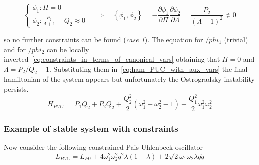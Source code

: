 \begin{equation*}
  \begin{cases}
    \phi_1: \Pi = 0 \\
    \phi_2: \frac{P_2}{\Lambda + 1} - Q_2 \approx 0
  \end{cases}
  \quad \Rightarrow \quad
  \left\{ \phi_1, \phi_2 \right\} = -
  \frac{\partial\phi_1}{\partial\Pi} \frac{\partial\phi_2}{\partial\Lambda} =
  \frac{P_2}{{(\Lambda + 1)}^2} \not\approx 0
\end{equation*}

so no further constraints can be found (\emph{case 1}). The equation for
$/phi_1$ (trivial) and for $/phi_2$ can be locally
inverted~\eqref{eq:constraints_in_terms_of_canonical_vars} obtaining that
$\Pi = 0$ and $\Lambda = P_2/Q_2 - 1$. Substituting them
in~\eqref{eq:ham_PUC_with_aux_vars} the final hamiltonian of the system appears
but unfortunately the Ostrogradsky instability persists.
\begin{equation} \label{eq:ham_PUC_instable}
   H_{PUC} =\ P_1 Q_2 + P_2 Q_2
  + \frac{Q_2^2}{2} \left(\omega_1^2 + \omega_2^2 - 1 \right)
  - \frac{Q_1^2}{2} \omega_1^2 \omega_2^2
\end{equation}


\subsubsection{Example of stable system with constraints}
Now consider the following constrained Pais-Uhlenbeck oscillator~\cite{Chen13}
\begin{equation}
  L_{PUC} = L_{PU} +
  4 \omega_1^2\omega_2^2 q^2 \lambda (1+ \lambda) +
  2 \sqrt{2} \omega_1\omega_2 \lambda q \ddot{q}
\end{equation}

